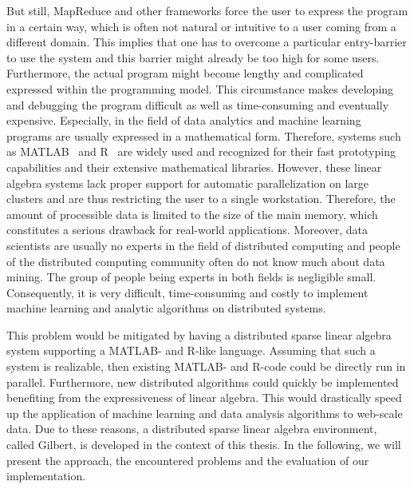 But still, MapReduce and other frameworks force the user to express the program in a certain way, which is often not natural or intuitive to a user coming from a different domain.
This implies that one has to overcome a particular entry-barrier to use the system and this barrier might already be too high for some users.
Furthermore, the actual program might become lengthy and complicated expressed within the programming model.
This circumstance makes developing and debugging the program difficult as well as time-consuming and eventually expensive.
Especially, in the field of data analytics and machine learning programs are usually expressed in a mathematical form.
Therefore, systems such as MATLAB~\cite{matlab} and R~\cite{r:1993a} are widely used and recognized for their fast prototyping capabilities and their extensive mathematical libraries.
However, these linear algebra systems lack proper support for automatic parallelization on large clusters and are thus restricting the user to a single workstation.
Therefore, the amount of processible data is limited to the size of the main memory, which constitutes a serious drawback for real-world applications.
Moreover, data scientists are usually no experts in the field of distributed computing and people of the distributed computing community often do not know much about data mining.
The group of people being experts in both fields is negligible small.
Consequently, it is very difficult, time-consuming and costly to implement machine learning and analytic algorithms on distributed systems.

This problem would be mitigated by having a distributed sparse linear algebra system supporting a MATLAB- and R-like language.
Assuming that such a system is realizable, then existing MATLAB- and R-code could be directly run in parallel.
Furthermore, new distributed algorithms could quickly be implemented benefiting from the expressiveness of linear algebra.
This would drastically speed up the application of machine learning and data analysis algorithms to web-scale data.
Due to these reasons, a distributed sparse linear algebra environment, called Gilbert, is developed in the context of this thesis.
In the following, we will present the approach, the encountered problems and the evaluation of our implementation.